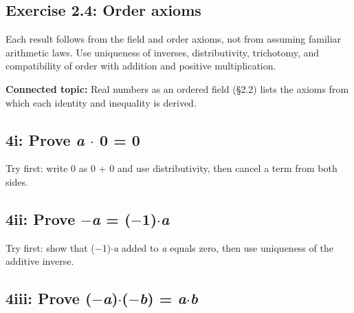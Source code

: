 \documentclass[11pt]{article}
\begin{document}
\begin{keepsection}
\section{Exercise 2.4: Order axioms}

Each result follows from the field and order axioms, not from assuming familiar arithmetic laws. Use uniqueness of inverses, distributivity, trichotomy, and compatibility of order with addition and positive multiplication.

\textbf{Connected topic:} Real numbers as an ordered field (§2.2) lists the axioms from which each identity and inequality is derived.

\begin{keepsection}
\subsection{4i: Prove \textit{a} \ensuremath{\cdot} 0 = 0}

Try first: write 0 as 0 + 0 and use distributivity, then cancel a term from both sides.

\end{keepsection}

\begin{keepsection}
\subsection{4ii: Prove \ensuremath{-}\textit{a} = (\ensuremath{-}1)\ensuremath{\cdot}\textit{a}}

Try first: show that (\ensuremath{-}1)\ensuremath{\cdot}\textit{a} added to \textit{a} equals zero, then use uniqueness of the additive inverse.

\end{keepsection}

\begin{keepsection}
\subsection{4iii: Prove (\ensuremath{-}\textit{a})\ensuremath{\cdot}(\ensuremath{-}\textit{b}) = \textit{a}\ensuremath{\cdot}\textit{b}}


\end{keepsection}
\end{keepsection}
\end{document}
